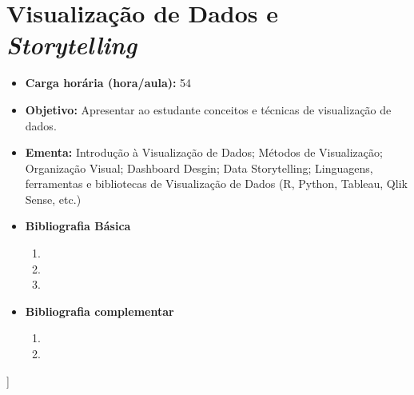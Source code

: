 \documentclass[
	10pt,				%
	openright,			%
	twoside,			%
	a4paper,			%
	english,			%
	french,				%
	brazil,				%
	sumario=tradicional
]{abntex2}
\begin{document}


\newpage
\section*{Visualização de Dados e \textit{Storytelling}}\label{6_opt03}
\begin{itemize}
	\item \textbf{Carga horária (hora/aula):} 54
	\item \textbf{Objetivo:} Apresentar ao estudante conceitos e técnicas de visualização de dados.
	\item \textbf{Ementa:} 
	Introdução à Visualização de Dados;
	Métodos de Visualização;
	Organização Visual;
	Dashboard Desgin;
	Data Storytelling;
	Linguagens, ferramentas e bibliotecas de Visualização de Dados (R, Python, Tableau, Qlik Sense, etc.)
	\item \textbf{Bibliografia Básica}
	\begin{enumerate}
		\item 
		\item 
		\item 
	\end{enumerate}
	\item \textbf{Bibliografia complementar}
	\begin{enumerate}
		\item 
		\item
	\end{enumerate} 	
\end{itemize}
]

\newpage
\end{document}
